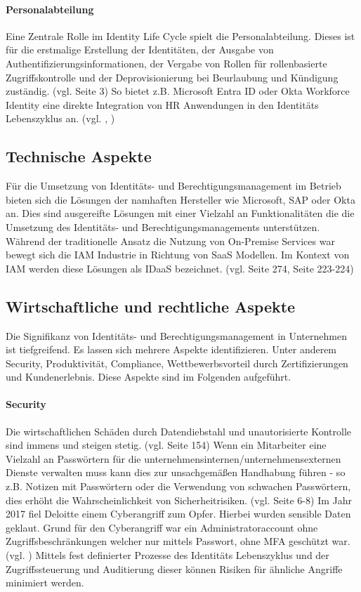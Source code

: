 \documentclass[11pt]{article}
\begin{document}
\paragraph{Personalabteilung}
Eine Zentrale Rolle im Identity Life Cycle spielt die Personalabteilung. Dieses ist für die erstmalige Erstellung der Identitäten, der Ausgabe von Authentifizierungsinformationen, der Vergabe von Rollen für rollenbasierte Zugriffskontrolle und der Deprovisionierung bei Beurlaubung und Kündigung zuständig. (vgl. \cite{mohammed2017systematic} Seite 3) So bietet z.B. Microsoft Entra ID oder Okta Workforce Identity eine direkte Integration von HR Anwendungen in den Identitäts Lebenszyklus an. (vgl. \cite{oktahr}, \cite{Billmath2024})
\subsection{Technische Aspekte}
Für die Umsetzung von Identitäts- und Berechtigungsmanagement im Betrieb bieten sich die Lösungen der namhaften Hersteller wie Microsoft, SAP oder Okta an. Dies sind ausgereifte Lösungen mit einer Vielzahl an Funktionalitäten die die Umsetzung des Identitäts- und Berechtigungsmanagements unterstützen. Während der traditionelle Ansatz die Nutzung von On-Premise Services war bewegt sich die IAM Industrie in Richtung von SaaS Modellen. Im Kontext von IAM werden diese Lösungen als IDaaS bezeichnet. (vgl. \cite{kunz2014analyzing} Seite 274, \cite{tsolkas2017} Seite 223-224)
\subsection{Wirtschaftliche und rechtliche Aspekte}
Die Signifikanz von Identitäts- und Berechtigungsmanagement in Unternehmen ist tiefgreifend. Es lassen sich mehrere Aspekte identifizieren. Unter anderem Security, Produktivität, Compliance, Wettbewerbsvorteil durch Zertifizierungen und Kundenerlebnis. Diese Aspekte sind im Folgenden aufgeführt.
\paragraph{Security}
Die wirtschaftlichen Schäden durch Datendiebstahl und unautorisierte Kontrolle sind immens und steigen stetig. (vgl. \cite{furnell2020understanding} Seite 154) Wenn ein Mitarbeiter eine Vielzahl an Passwörtern für die unternehmensinternen/unternehmensexternen Dienste verwalten muss kann dies zur unsachgemäßen Handhabung führen - so z.B. Notizen mit Passwörtern oder die Verwendung von schwachen Passwörtern, dies erhöht die Wahrscheinlichkeit von Sicherheitrisiken. (vgl. \cite{haag2012selecting} Seite 6-8) Im Jahr 2017 fiel Deloitte einem Cyberangriff zum Opfer. Hierbei wurden sensible Daten geklaut. Grund für den Cyberangriff war ein Administratoraccount ohne Zugriffsbeschränkungen welcher nur mittels Passwort, ohne MFA geschützt war. (vgl. \cite{deloitte2017}) Mittels fest definierter Prozesse des Identitäts Lebenszyklus und der Zugriffssteuerung und Auditierung dieser können Risiken für ähnliche Angriffe minimiert werden.
\end{document}
